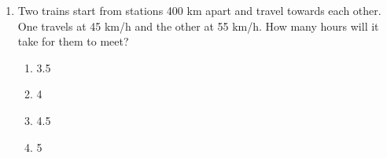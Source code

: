 \documentclass[12pt]{scrartcl}
\begin{document}
\begin{enumerate}
    \item Two trains start from stations 400 km apart and travel towards each other. One travels at 45 km/h and the other at 55 km/h. How many hours will it take for them to meet?
    \begin{enumerate}
        \item 3.5
        \item 4
        \item 4.5
        \item 5
    \end{enumerate}

\end{enumerate}
\end{document}
